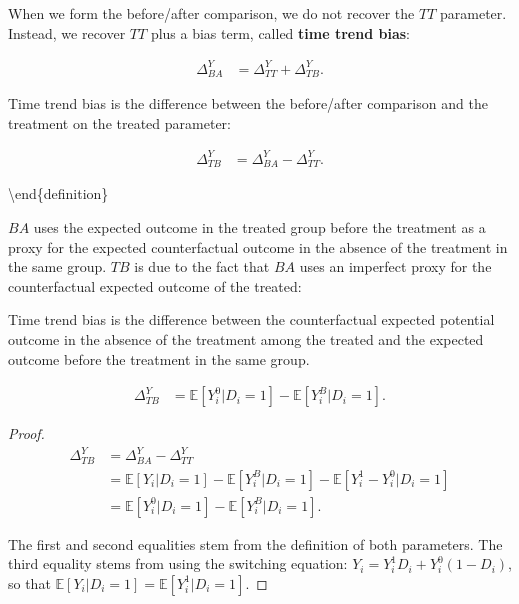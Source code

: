 \documentclass[]{book}
\newcommand{\esp}[1]{\mathbb{E}[ #1 ]}
\theoremstyle{definition}
\theoremstyle{definition}
\theoremstyle{definition}
\theoremstyle{remark}
\let\BeginKnitrBlock\begin \let\EndKnitrBlock\end
\begin{document}
When we form the before/after comparison, we do not recover the \(TT\)
parameter. Instead, we recover \(TT\) plus a bias term, called
\textbf{time trend bias}:

\begin{align*}
\Delta^Y_{BA} & =\Delta^Y_{TT}+\Delta^Y_{TB}.
\end{align*}

\BeginKnitrBlock{definition}[Time trend bias]
\protect\hypertarget{def:unnamed-chunk-26}{}{\label{def:unnamed-chunk-26}
\iffalse (Time trend bias) \fi{} }Time trend bias is the difference
between the before/after comparison and the treatment on the treated
parameter:

\begin{align*}
\Delta^Y_{TB} & = \Delta^Y_{BA}-\Delta^Y_{TT} .
\end{align*}

\textbackslash{}end\{definition\}
\EndKnitrBlock{definition}

\(BA\) uses the expected outcome in the treated group before the
treatment as a proxy for the expected counterfactual outcome in the
absence of the treatment in the same group. \(TB\) is due to the fact
that \(BA\) uses an imperfect proxy for the counterfactual expected
outcome of the treated:

\BeginKnitrBlock{theorem}
\protect\hypertarget{thm:TB}{}{\label{thm:TB} }Time trend bias is the
difference between the counterfactual expected potential outcome in the
absence of the treatment among the treated and the expected outcome
before the treatment in the same group.

\begin{align*}
\Delta^Y_{TB} & = \esp{Y_i^0|D_i=1}-\esp{Y_i^B|D_i=1}.
\end{align*}
\EndKnitrBlock{theorem}

\BeginKnitrBlock{proof}
\iffalse{} {Proof. } \fi{}

\begin{align*}
\Delta^Y_{TB} & = \Delta^Y_{BA}-\Delta^Y_{TT} \\
              & = \esp{Y_i|D_i=1}-\esp{Y^B_i|D_i=1}-\esp{Y_i^1-Y_i^0|D_i=1}\\
              & = \esp{Y_i^0|D_i=1}-\esp{Y_i^B|D_i=1}.
\end{align*}

The first and second equalities stem from the definition of both
parameters. The third equality stems from using the switching equation:
\(Y_i=Y_i^1D_i+Y_i^0(1-D_i)\), so that
\(\esp{Y_i|D_i=1}=\esp{Y^1_i|D_i=1}\).
\EndKnitrBlock{proof}
\end{document}
